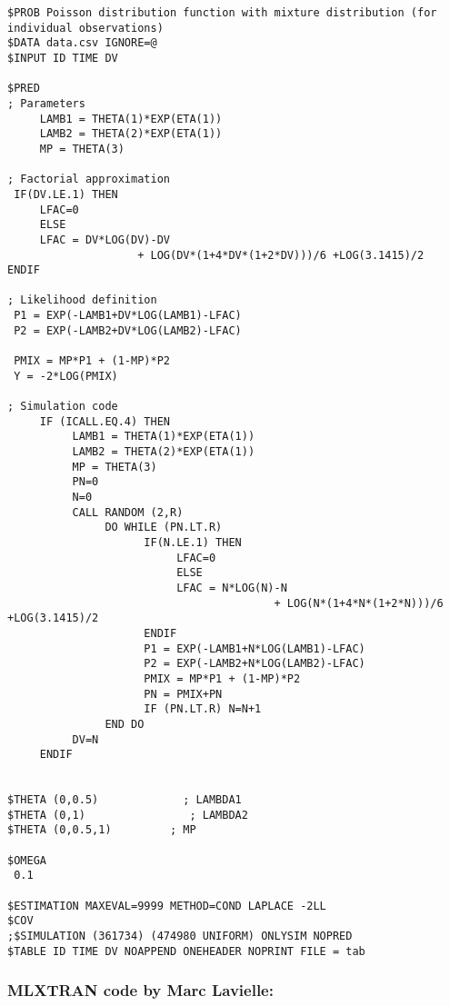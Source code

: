 \lstset{language=NONMEMdataSet}
\begin{lstlisting}
$PROB Poisson distribution function with mixture distribution (for individual observations) 
$DATA data.csv IGNORE=@ 
$INPUT ID TIME DV

$PRED 
; Parameters
     LAMB1 = THETA(1)*EXP(ETA(1)) 
     LAMB2 = THETA(2)*EXP(ETA(1)) 
     MP = THETA(3)

; Factorial approximation 
 IF(DV.LE.1) THEN
     LFAC=0 
     ELSE 
     LFAC = DV*LOG(DV)-DV 
                    + LOG(DV*(1+4*DV*(1+2*DV)))/6 +LOG(3.1415)/2
ENDIF

; Likelihood definition 
 P1 = EXP(-LAMB1+DV*LOG(LAMB1)-LFAC) 
 P2 = EXP(-LAMB2+DV*LOG(LAMB2)-LFAC)

 PMIX = MP*P1 + (1-MP)*P2 
 Y = -2*LOG(PMIX)

; Simulation code 
     IF (ICALL.EQ.4) THEN
          LAMB1 = THETA(1)*EXP(ETA(1)) 
          LAMB2 = THETA(2)*EXP(ETA(1)) 
          MP = THETA(3) 
          PN=0
          N=0 
          CALL RANDOM (2,R)
               DO WHILE (PN.LT.R) 
                     IF(N.LE.1) THEN
                          LFAC=0 
                          ELSE 
                          LFAC = N*LOG(N)-N 
                                         + LOG(N*(1+4*N*(1+2*N)))/6 +LOG(3.1415)/2
                     ENDIF 
                     P1 = EXP(-LAMB1+N*LOG(LAMB1)-LFAC) 
                     P2 = EXP(-LAMB2+N*LOG(LAMB2)-LFAC) 
                     PMIX = MP*P1 + (1-MP)*P2
                     PN = PMIX+PN 
                     IF (PN.LT.R) N=N+1
               END DO
          DV=N 
     ENDIF


$THETA (0,0.5)             ; LAMBDA1
$THETA (0,1)                ; LAMBDA2
$THETA (0,0.5,1)         ; MP

$OMEGA 
 0.1

$ESTIMATION MAXEVAL=9999 METHOD=COND LAPLACE -2LL 
$COV 
;$SIMULATION (361734) (474980 UNIFORM) ONLYSIM NOPRED 
$TABLE ID TIME DV NOAPPEND ONEHEADER NOPRINT FILE = tab
\end{lstlisting}

\myEndLine

\subsubsection{MLXTRAN code by Marc Lavielle:}

\myStartLine

